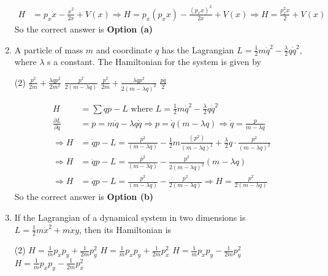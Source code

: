 \begin{enumerate}
\begin{answer}
$$\begin{aligned}
	H&=p_{x} \dot{x}-\frac{\dot{x}^{2}}{2 x}+V(x) \Rightarrow H=p_{x}\left(p_{x} x\right)-\frac{\left(p_{x} x\right)^{2}}{2 x}+V(x) \Rightarrow H=\frac{p_{x}^{2} x}{2}+V(x)
\end{aligned}
$$
	So the correct answer is \textbf{Option (a)}
\end{answer}
\item A particle of mass $m$ and coordinate $q$ has the Lagrangian $L=\frac{1}{2} m \dot{q}^{2}-\frac{\lambda}{2} q \dot{q}^{2}$, where $\lambda$ s a constant. The Hamiltonian for the system is given by 
{}
 \begin{tasks}(2)
	\task[\textbf{a.}]$\frac{p^{2}}{2 m}+\frac{\lambda q p^{2}}{2 m^{2}}$
	\task[\textbf{b.}] $\frac{p^{2}}{2(m-\lambda q)}$
	\task[\textbf{c.}]$\frac{p^{2}}{2 m}+\frac{\lambda q p^{2}}{2(m-\lambda q)^{2}}$
	\task[\textbf{d.}] $\frac{p \dot{q}}{2}$
\end{tasks}
\begin{answer}
	$$
	\begin{aligned}
	H&=\sum \dot{q} p-L \text { where } L=\frac{1}{2} m \dot{q}^{2}-\frac{\lambda}{2} q \dot{q}^{2}\\
	\frac{\partial L}{\partial \dot{q}}&=p=m \dot{q}-\lambda q \dot{q} \Rightarrow p=\dot{q}(m-\lambda q) \Rightarrow \dot{q}=\frac{p}{m-\lambda q} \\
	\Rightarrow H&=\dot{q} p-L=\frac{p^{2}}{(m-\lambda q)}-\frac{1}{2} m \frac{\left(p^{2}\right)}{(m-\lambda q)^{2}}+\frac{\lambda}{2} q \cdot \frac{p^{2}}{(m-\lambda q)^{2}} \\
	\Rightarrow H&=\dot{q} p-L=\frac{p^{2}}{(m-\lambda q)}-\frac{p^{2}}{2(m-\lambda q)^{2}}(m-\lambda q) \\
	\Rightarrow H&=\dot{q} p-L=\frac{p^{2}}{(m-\lambda q)}-\frac{p^{2}}{2(m-\lambda q)} \Rightarrow H=\frac{p^{2}}{2(m-\lambda q)}
\end{aligned}
$$
	So the correct answer is \textbf{Option (b)}
\end{answer}
\item If the Lagrangian of a dynamical system in two dimensions is $L=\frac{1}{2} m \dot{x}^{2}+m \dot{x} \dot{y}$, then its Hamiltonian is
{}
 \begin{tasks}(2)
	\task[\textbf{a.}] $H=\frac{1}{m} p_{x} p_{y}+\frac{1}{2 m} p_{y}^{2}$
	\task[\textbf{b.}] $H=\frac{1}{m} p_{x} p_{y}+\frac{1}{2 m} p_{x}^{2}$
	\task[\textbf{c.}] $H=\frac{1}{m} p_{x} p_{y}-\frac{1}{2 m} p_{y}^{2}$
	\task[\textbf{d.}]  $H=\frac{1}{m} p_{x} p_{y}-\frac{1}{2 m} p_{x}^{2}$

\end{tasks}
\end{enumerate}
